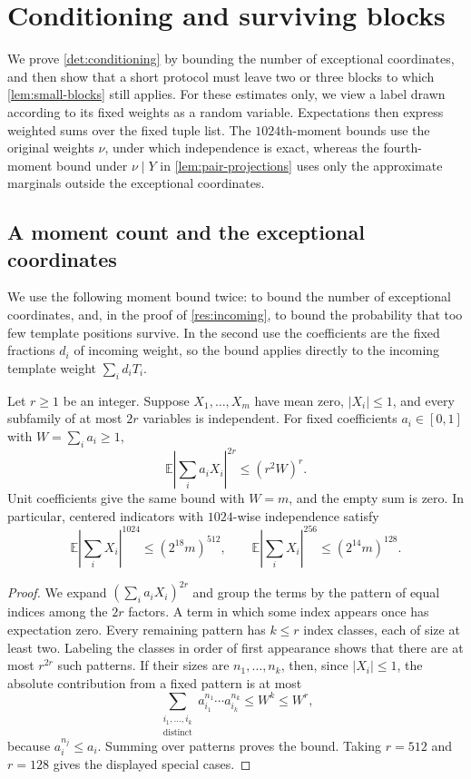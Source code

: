 \documentclass[11pt,letterpaper]{article} \usepackage[utf8]{inputenc}
\theoremstyle{plain} \newtheorem{theorem}{Theorem}[section]
\theoremstyle{definition} \newaliascnt{definition}{theorem}
\begin{document}
\section{Conditioning and surviving blocks}
\label{sec:conditioning-details}

We prove \cref{det:conditioning} by bounding the number of exceptional
coordinates, and then show that a short protocol must leave two or three
blocks to which \cref{lem:small-blocks} still applies. For these estimates only,
we view a label drawn according to its fixed weights as a random variable.
Expectations then express weighted sums over the fixed tuple list. The
$1024$th-moment bounds use the original weights $\nu$, under which
independence is exact, whereas the fourth-moment bound under $\nu\mid Y$ in
\cref{lem:pair-projections} uses only the approximate marginals outside the
exceptional coordinates.

\subsection{A moment count and the exceptional coordinates}
\label{sec:conditioning-moments}

We use the following moment bound twice: to bound the number of exceptional
coordinates, and, in the proof of \cref{res:incoming}, to bound the probability
that too few template positions survive. In the second use the coefficients are
the fixed fractions $d_i$ of incoming weight, so the bound applies directly to
the incoming template weight $\sum_id_iT_i$.

\begin{lemma}\label{lem:conditioning-moment}
Let $r\ge1$ be an integer. Suppose $X_1,\ldots,X_m$ have mean zero,
$|X_i|\le1$, and every subfamily of at most $2r$ variables is independent.
For fixed coefficients $a_i\in[0,1]$ with $W=\sum_i a_i\ge1$,
\[
\mathbb E\left|\sum_i a_iX_i\right|^{2r}\le(r^2W)^r.
\]
Unit coefficients give the same bound with $W=m$, and the empty sum is zero.
In particular, centered indicators with $1024$-wise independence satisfy
\[
\mathbb E\left|\sum_iX_i\right|^{1024}\le(2^{18}m)^{512},
\qquad
\mathbb E\left|\sum_iX_i\right|^{256}\le(2^{14}m)^{128}.
\]
\end{lemma}
\begin{proof}
We expand $(\sum_ia_iX_i)^{2r}$ and group the terms by the pattern of equal
indices among the $2r$ factors. A term in which some index appears once has
expectation zero. Every
remaining pattern has $k\le r$ index classes, each of size at least two.
Labeling the classes in order of first appearance shows that there are at
most $r^{2r}$ such patterns. If their sizes are $n_1,\ldots,n_k$, then,
since $|X_i|\le1$, the absolute contribution from a fixed pattern is at most
\[
\sum_{\substack{i_1,\ldots,i_k\\\text{distinct}}}
a_{i_1}^{n_1}\cdots a_{i_k}^{n_k}\le W^k\le W^r,
\]
because $a_i^{n_j}\le a_i$. Summing over patterns proves the bound.
Taking $r=512$ and $r=128$ gives the displayed special cases.
\end{proof}
\end{document}
